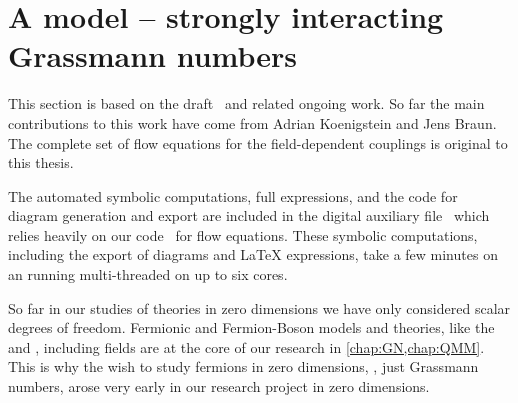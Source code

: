 \section{A  model -- strongly interacting Grassmann numbers}\label{sec:0dSU2}
\begin{disclaimer}
	This section is based on the draft~\cite{Steil:partIV} and related ongoing work. So far the main contributions to this work have come from Adrian Koenigstein and Jens Braun. The complete set of flow equations for the field-dependent couplings is original to this thesis.
	
	The automated symbolic computations, full expressions, and the code for diagram generation and export are included in the digital auxiliary file~\cite{Steil:2023zeroDSU2} which relies heavily on 
	our \WAM{} code~\cite{Steil:2023PhDFlowEquationsNB} for flow equations. These symbolic computations, including the export of diagrams and \LaTeX{} expressions, take a few minutes on an \intel{} running multi-threaded on up to six cores.
\end{disclaimer}
\renewcommand{\FSk}{t}
So far in our studies of theories in zero dimensions we have only considered scalar degrees of freedom. 
Fermionic and Fermion-Boson models and theories, like the \qmm{} and \gnm{}, including \gmv{} fields are at the core of our research in \cref{chap:GN,chap:QMM}. 
This is why the wish to study fermions in zero dimensions, \ie{}, just Grassmann numbers, arose very early in our research project in zero dimensions.

